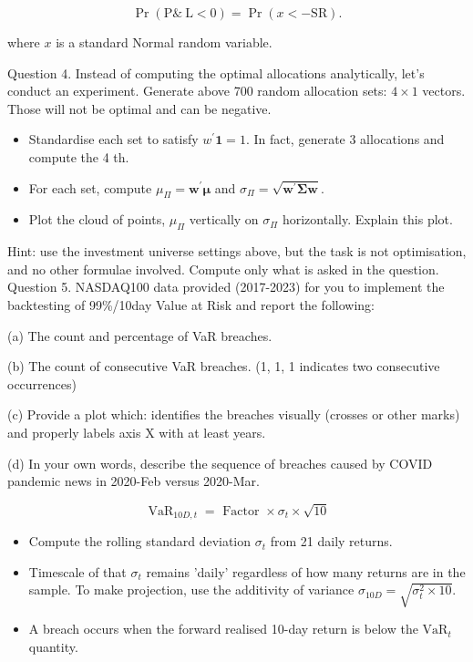 \documentclass[10pt]{article}
\begin{document}
$$
\operatorname{Pr}(\mathrm{P} \& \mathrm{~L}<0)=\operatorname{Pr}(x<-\mathrm{SR}) .
$$

where $x$ is a standard Normal random variable.

Question 4. Instead of computing the optimal allocations analytically, let's conduct an experiment. Generate above 700 random allocation sets: $4 \times 1$ vectors. Those will not be optimal and can be negative.

\begin{itemize}
  \item Standardise each set to satisfy $w^{\prime} \mathbf{1}=1$. In fact, generate 3 allocations and compute the 4 th.

  \item For each set, compute $\mu_{\Pi}=\boldsymbol{w}^{\prime} \boldsymbol{\mu}$ and $\sigma_{\Pi}=\sqrt{\boldsymbol{w}^{\prime} \boldsymbol{\Sigma} \boldsymbol{w}}$.

  \item Plot the cloud of points, $\mu_{\Pi}$ vertically on $\sigma_{\Pi}$ horizontally. Explain this plot.

\end{itemize}

Hint: use the investment universe settings above, but the task is not optimisation, and no other formulae involved. Compute only what is asked in the question. Question 5. NASDAQ100 data provided (2017-2023) for you to implement the backtesting of 99\%/10day Value at Risk and report the following:

(a) The count and percentage of VaR breaches.

(b) The count of consecutive VaR breaches. (1, 1, 1 indicates two consecutive occurrences)

(c) Provide a plot which: identifies the breaches visually (crosses or other marks) and properly labels axis $\mathrm{X}$ with at least years.

(d) In your own words, describe the sequence of breaches caused by COVID pandemic news in 2020-Feb versus 2020-Mar.

$$
\operatorname{VaR}_{10 D, t}=\text { Factor } \times \sigma_{t} \times \sqrt{10}
$$

\begin{itemize}
  \item Compute the rolling standard deviation $\sigma_{t}$ from 21 daily returns.

  \item Timescale of that $\sigma_{t}$ remains 'daily' regardless of how many returns are in the sample. To make projection, use the additivity of variance $\sigma_{10 D}=\sqrt{\sigma_{t}^{2} \times 10}$.

  \item A breach occurs when the forward realised 10-day return is below the $\mathrm{VaR}_{t}$ quantity.

\end{itemize}
\end{document}
